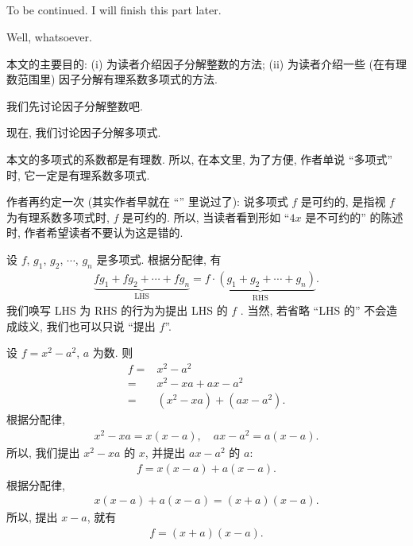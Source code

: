 \subsection*{\FactorizationOfPolynomialsOverQ}
\markright{\FactorizationOfPolynomialsOverQ}

To be continued. I will finish this part later.

Well, whatsoever.

本文的主要目的: (i) 为读者介绍因子分解整数的方法; (ii) 为读者介绍一些 (在有理数范围里) 因子分解有理系数多项式的方法.

我们先讨论因子分解整数吧.

\myLine

现在, 我们讨论因子分解多项式.

本文的多项式的系数都是有理数. 所以, 在本文里, 为了方便, 作者单说 ``多项式'' 时, 它一定是有理系数多项式.

作者再约定一次 (其实作者早就在 ``\PolynomialsOverZAndOverQ '' 里说过了): 说多项式 $f$ 是可约的, 是指视 $f$ 为有理系数多项式时, $f$ 是可约的. 所以, 当读者看到形如 ``$4x$ 是不可约的'' 的陈述时, 作者希望读者不要认为这是错的.

\begin{definition}
    设 $f$, $g_1$, $g_2$, $\cdots$, $g_n$ 是多项式. 根据分配律, 有
    \begin{align*}
        \underbrace{fg_1 + fg_2 + \cdots + fg_n}_{\text{LHS}} = \underbrace{f \cdot (g_1 + g_2 + \cdots + g_n)}_{\text{RHS}}.
    \end{align*}
    我们唤写 LHS 为 RHS 的行为为提出 LHS 的 $f$ . 当然, 若省略 ``LHS 的'' 不会造成歧义, 我们也可以只说 ``提出 $f$''.
\end{definition}

\begin{example}
    设 $f = x^2 - a^2$, $a$ 为数. 则
    \begin{align*}
        f
        = {} & x^2 - a^2                \\
        = {} & x^2 - xa + ax - a^2      \\
        = {} & (x^2 - xa) + (ax - a^2).
    \end{align*}
    根据分配律,
    \begin{align*}
        x^2 - xa = x(x - a), \quad ax - a^2 = a(x - a).
    \end{align*}
    所以, 我们提出 $x^2 - xa$ 的 $x$, 并提出 $ax - a^2$ 的 $a$:
    \begin{align*}
        f = x(x - a) + a(x - a).
    \end{align*}
    根据分配律,
    \begin{align*}
        x(x - a) + a(x - a) = (x + a)(x - a).
    \end{align*}
    所以, 提出 $x-a$, 就有
    \begin{align*}
        f = (x + a)(x - a).
    \end{align*}
\end{example}

